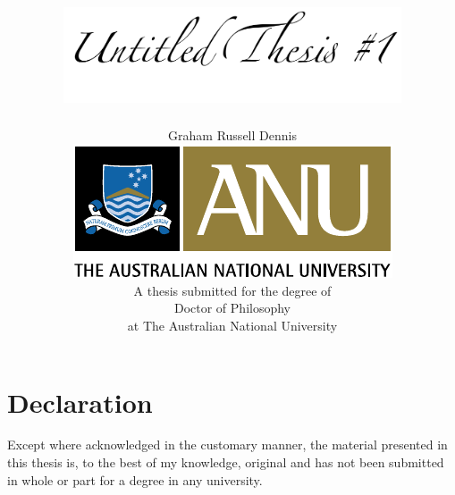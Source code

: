 \documentclass[twoside,onecolumn,11pt,a4paper,final]{book}
\begin{document}

\begin{titlepage}
\graphicspath{{Figures/TitlePage/}}
\title{\includegraphics[width=10cm]{UntitledTitle}}
 \author{Graham Russell Dennis\\[6cm]
 \includegraphics{ANU_PMS}\\[2cm]
  A thesis submitted for the degree of\\
  Doctor of Philosophy \\
  at The Australian National University\\[1cm]}
\maketitle
 \end{titlepage}
 
 \sloppy
 
\chapter*{Declaration}


Except where acknowledged in the customary manner, the material 
presented in this thesis is, to the best of my knowledge, original and 
has not been submitted in whole or part for a degree in any 
university.

\vspace{20mm}  %
\end{document}
